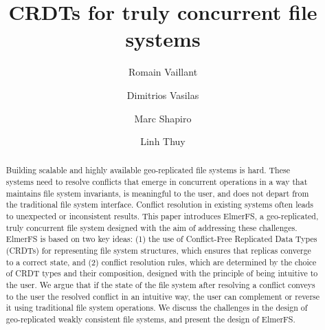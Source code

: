 \documentclass[sigconf, 10pt]{acmart}
\begin{document}
\title{CRDTs for truly concurrent file systems}

\author{Romain Vaillant}

\author{Dimitrios Vasilas}

\author{Marc Shapiro}

\author{Linh Thuy}

\renewcommand{\shortauthors}{R. Vaillant et al.}

\begin{abstract}

Building scalable and highly available geo-replicated file
systems is hard. These systems need to resolve conflicts that
emerge in concurrent operations in a way that maintains
file system invariants, is meaningful to the user, and does
not depart from the traditional file system interface. Conflict
resolution in existing systems often leads to unexpected
or inconsistent results. This paper introduces ElmerFS, a
geo-replicated, truly concurrent file system designed with
the aim of addressing these challenges. ElmerFS is based
on two key ideas: (1) the use of Conflict-Free Replicated
Data Types (CRDTs) for representing file system structures,
which ensures that replicas converge to a correct state, and
(2) conflict resolution rules, which are determined by the
choice of CRDT types and their composition, designed
with the principle of being intuitive to the user. We argue
that if the state of the file system after resolving a conflict
conveys to the user the resolved conflict in an intuitive way,
the user can complement or reverse it using traditional file
system operations. We discuss the challenges in the design
of geo-replicated weakly consistent file systems, and present
the design of ElmerFS.

\end{abstract}

\end{document}
